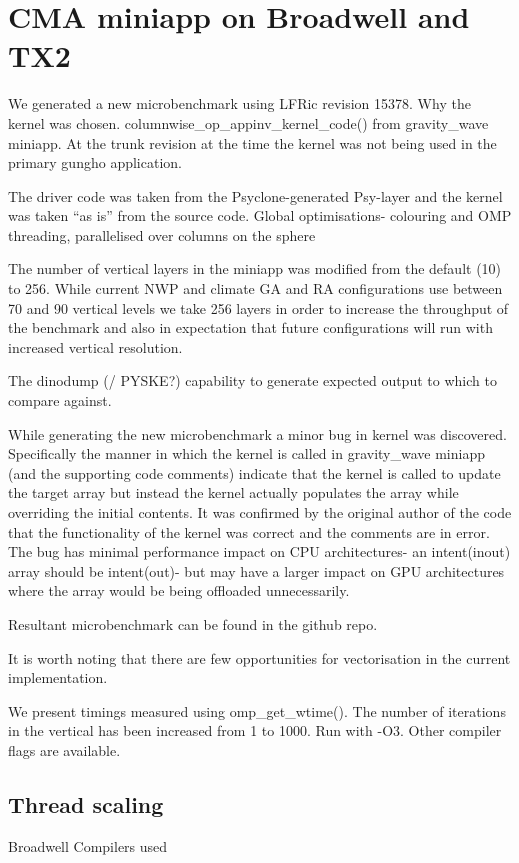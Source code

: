 \section{CMA miniapp on Broadwell and TX2}

We generated a new microbenchmark using LFRic revision 15378.
Why the kernel was chosen.
columnwise\_op\_appinv\_kernel\_code() from gravity\_wave miniapp. At the trunk revision at the time the kernel was not being used in the primary gungho application.

The driver code was taken from the Psyclone-generated Psy-layer and the kernel was taken ``as is'' from the source code.
Global optimisations- colouring and OMP threading, parallelised over columns on the sphere

The number of vertical layers in the miniapp was modified from the default (10) to 256. While current NWP and climate GA and RA configurations use between 70 and 90 vertical levels we take 256 layers in order to increase the throughput of the benchmark and also in expectation that future configurations will run with increased vertical resolution.

The dinodump (/ PYSKE?) capability to generate expected output to which to compare against.


While generating the new microbenchmark a minor bug in kernel was discovered. Specifically the manner in which the kernel is called in gravity\_wave miniapp (and the supporting code comments) indicate that the kernel is called to update the target array but instead the kernel actually populates the array while overriding the initial contents. It was confirmed by the original author of the code that the functionality of the kernel was correct and the comments are in error. The bug has minimal performance impact on CPU architectures- an intent(inout) array should be intent(out)- but may have a larger impact on GPU architectures where the array would be being offloaded unnecessarily. 

Resultant microbenchmark can be found in the github repo.


It is worth noting that there are few opportunities for vectorisation in the current implementation.

We present timings measured using omp\_get\_wtime(). The number of iterations in the vertical has been increased from 1 to 1000. Run with -O3. Other compiler flags are available.


\subsection{Thread scaling}
Broadwell
Compilers used

